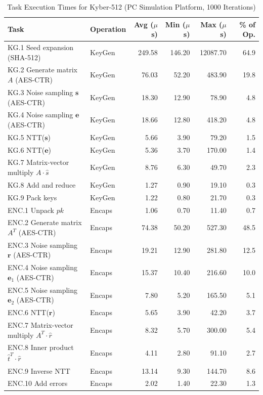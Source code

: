 \documentclass[journal]{IEEEtran}
\begin{document}
\begin{table}[!t]
\renewcommand{\arraystretch}{1.15}
\caption{Task Execution Times for Kyber-512 (PC Simulation Platform, 1000 Iterations)}
\label{tab:profiling}
\centering
\begin{tabular}{l l r r r r}
\toprule
\textbf{Task} & \textbf{Operation} & \textbf{Avg ($\mu$s)} & \textbf{Min ($\mu$s)} & \textbf{Max ($\mu$s)} & \textbf{\% of Op.} \\
\midrule
KG.1 Seed expansion (SHA-512) & KeyGen & 249.58 & 146.20 & 12087.70 & 64.9 \\
KG.2 Generate matrix $A$ (AES-CTR) & KeyGen & 76.03 & 52.20 & 483.90 & 19.8 \\
KG.3 Noise sampling $\mathbf{s}$ (AES-CTR) & KeyGen & 18.30 & 12.90 & 78.90 & 4.8 \\
KG.4 Noise sampling $\mathbf{e}$ (AES-CTR) & KeyGen & 18.66 & 12.80 & 418.20 & 4.8 \\
KG.5 NTT($\mathbf{s}$) & KeyGen & 5.66 & 3.90 & 79.20 & 1.5 \\
KG.6 NTT($\mathbf{e}$) & KeyGen & 5.36 & 3.70 & 170.00 & 1.4 \\
KG.7 Matrix-vector multiply $A \cdot \hat{s}$ & KeyGen & 8.76 & 6.30 & 49.70 & 2.3 \\
KG.8 Add and reduce & KeyGen & 1.27 & 0.90 & 19.10 & 0.3 \\
KG.9 Pack keys & KeyGen & 1.22 & 0.80 & 21.70 & 0.3 \\
\midrule
ENC.1 Unpack $pk$ & Encaps & 1.06 & 0.70 & 11.40 & 0.7 \\
ENC.2 Generate matrix $A^T$ (AES-CTR) & Encaps & 74.38 & 50.20 & 527.30 & 48.5 \\
ENC.3 Noise sampling $\mathbf{r}$ (AES-CTR) & Encaps & 19.21 & 12.90 & 281.80 & 12.5 \\
ENC.4 Noise sampling $\mathbf{e}_1$ (AES-CTR) & Encaps & 15.37 & 10.40 & 216.60 & 10.0 \\
ENC.5 Noise sampling $\mathbf{e}_2$ (AES-CTR) & Encaps & 7.80 & 5.20 & 165.50 & 5.1 \\
ENC.6 NTT($\mathbf{r}$) & Encaps & 5.65 & 3.90 & 42.20 & 3.7 \\
ENC.7 Matrix-vector multiply $A^T \cdot \hat{r}$ & Encaps & 8.32 & 5.70 & 300.00 & 5.4 \\
ENC.8 Inner product $\hat{t}^T \cdot \hat{r}$ & Encaps & 4.11 & 2.80 & 91.10 & 2.7 \\
ENC.9 Inverse NTT & Encaps & 13.14 & 9.30 & 144.70 & 8.6 \\
ENC.10 Add errors & Encaps & 2.02 & 1.40 & 22.30 & 1.3 \\

\end{tabular}
\end{table}
\end{document}
